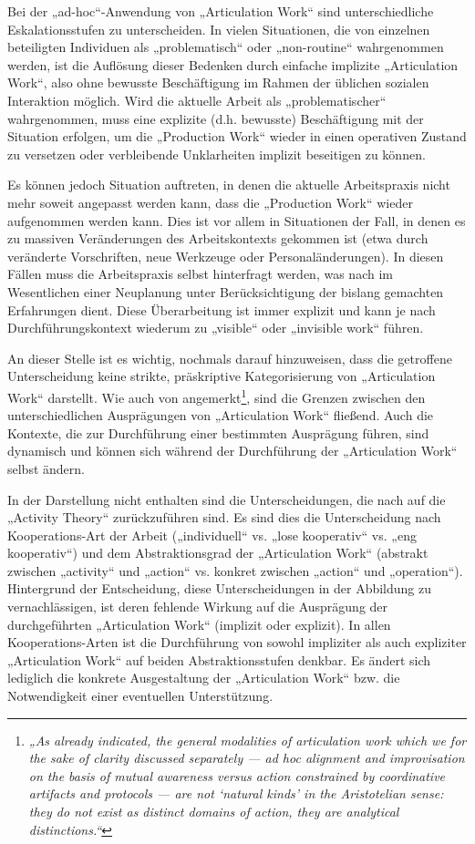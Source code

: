 Bei der „ad-hoc“-Anwendung von „Articulation Work“ sind unterschiedliche Eskalationsstufen zu unterscheiden. In vielen Situationen, die von einzelnen beteiligten Individuen als „problematisch“ oder „non-routine“ wahrgenommen werden, ist die Auflösung dieser Bedenken durch einfache implizite „Articulation Work“, also ohne bewusste Beschäftigung im Rahmen der üblichen sozialen Interaktion möglich. Wird die aktuelle Arbeit als „problematischer“ wahrgenommen, muss eine explizite (d.h. bewusste) Beschäftigung mit der Situation erfolgen, um die „Production Work“ wieder in einen operativen Zustand zu versetzen oder verbleibende Unklarheiten implizit beseitigen zu können. 

Es können jedoch Situation auftreten, in denen die aktuelle Arbeitspraxis nicht mehr soweit angepasst werden kann, dass die „Production Work“ wieder aufgenommen werden kann. Dies ist vor allem in Situationen der Fall, in denen es zu massiven Veränderungen des Arbeitskontexts gekommen ist (etwa durch veränderte Vorschriften, neue Werkzeuge oder Personaländerungen). In diesen Fällen muss die Arbeitspraxis selbst hinterfragt werden, was nach \citep{Corbin93} im Wesentlichen einer Neuplanung unter Berücksichtigung der bislang gemachten Erfahrungen dient. Diese Überarbeitung ist immer explizit und kann je nach Durchführungskontext wiederum zu „visible“ oder „invisible work“ führen.

An dieser Stelle ist es wichtig, nochmals darauf hinzuweisen, dass die getroffene Unterscheidung keine strikte, präskriptive Kategorisierung von „Articulation Work“ darstellt. Wie auch von \citet{Schmidt00} angemerkt\footnote{\emph{„As already indicated, the general modalities of articulation work which we for the sake of clarity discussed separately — ad hoc alignment and improvisation on the basis of mutual awareness versus action constrained by coordinative artifacts and protocols — are not ‘natural kinds’ in the Aristotelian sense: they do not exist as distinct domains of action, they are analytical distinctions.“}\citep[][S. 7]{Schmidt00}}, sind die Grenzen zwischen den unterschiedlichen Ausprägungen von „Articulation Work“ fließend. Auch die Kontexte, die zur Durchführung einer bestimmten Ausprägung führen, sind dynamisch und können sich während der Durchführung der „Articulation Work“ selbst ändern.

In der Darstellung nicht enthalten sind die Unterscheidungen, die nach \citep{Fjuk97} auf die „Activity Theory“ zurückzuführen sind. Es sind dies die Unterscheidung nach Kooperations-Art der Arbeit („individuell“ vs. „lose kooperativ“ vs. „eng kooperativ“) und dem Abstraktionsgrad der „Articulation Work“ (abstrakt zwischen „activity“ und „action“ vs. konkret zwischen „action“ und „operation“). Hintergrund der Entscheidung, diese Unterscheidungen in der Abbildung zu vernachlässigen, ist deren fehlende Wirkung auf die Ausprägung der durchgeführten „Articulation Work“ (implizit oder explizit). In allen Kooperations-Arten ist die Durchführung von sowohl impliziter als auch expliziter „Articulation Work“ auf beiden Abstraktionsstufen denkbar. Es ändert sich lediglich die konkrete Ausgestaltung der „Articulation Work“ bzw. die Notwendigkeit einer eventuellen Unterstützung. 

